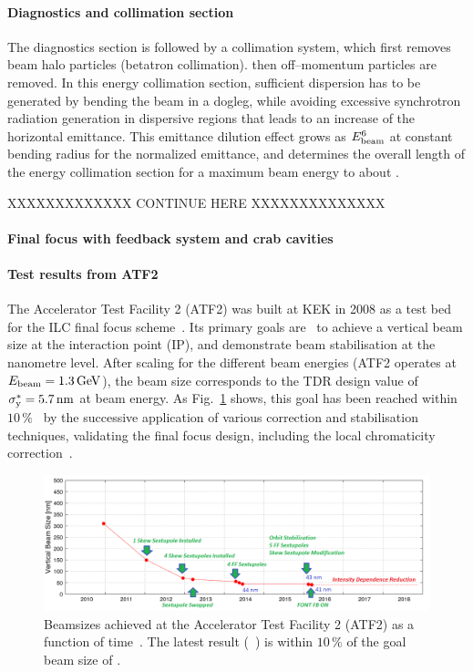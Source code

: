 \paragraph{Diagnostics and collimation section}
The diagnostics section is followed by a collimation system, which first removes beam halo particles (betatron collimation). 
then off--momentum particles are removed.
In this energy collimation section, sufficient dispersion has to be generated by bending the beam in a dogleg, while avoiding excessive synchrotron radiation generation in dispersive regions that leads to an increase of the horizontal emittance.
This emittance dilution effect grows as $E_{\mathrm{beam}}^6$ at constant bending radius for the normalized emittance, and determines the overall length of the energy collimation section for a maximum  beam energy to about .



XXXXXXXXXXXXX CONTINUE HERE XXXXXXXXXXXXXX

\paragraph {Final focus with feedback system and crab cavities}

\paragraph {Test results from ATF2}
The Accelerator Test Facility 2 (ATF2) was built at KEK in 2008 as a test bed for the ILC final focus scheme~\cite[Sec. 3.6]{Adolphsen:2013jya}.
Its primary goals are~\cite{Grishanov:2005ek,Grishanov:2006kx} to achieve a  vertical beam size at the interaction point (IP), and demonstrate beam stabilisation at the nanometre level.
After scaling for the different beam energies (ATF2 operates at $E_{\mathrm{beam}}=1.3\,{\mathrm{GeV}}$), the  beam size corresponds to the TDR design value of $\sigma_{\mathrm{y}}^* = 5.7\,{\mathrm{nm}}$ at  beam energy.
As Fig.~\ref{fig:atf-results} shows, this goal has been reached within $10\,\%$~\cite{Okugi:2017jji} by the successive application of various correction and stabilisation techniques, 
validating the final focus design, including the local chromaticity correction~\cite{White:2014vwa}.

\begin{figure}[htbp]
   \includegraphics[width=\hsize]{chapters/figures/ATF2trend2018}
\caption{Beamsizes achieved at the Accelerator Test Facility 2 (ATF2) as a function of time~\cite{bib:atf2esu}. The latest result (~\cite{Okugi:2017jji}) is within $10\,\%$ of the goal beam size of .}
\label{fig:atf-results}
\end{figure}

